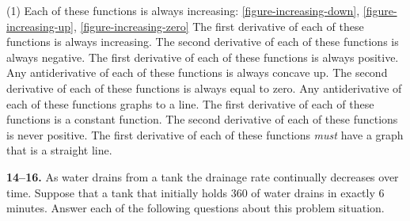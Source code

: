 \documentclass[10pt,oneside,]{book}
\theoremstyle{plain}
\theoremstyle{definition}
\numberwithin{equation}{section}
\begin{document}
\par
\begin{exercisegroup}(1)
\exercise[4.]\hypertarget{exercise-301}{\null}Each of these functions is always increasing: \hyperref[figure-increasing-down]{\ref{figure-increasing-down}}, \hyperref[figure-increasing-up]{\ref{figure-increasing-up}}, \hyperref[figure-increasing-zero]{\ref{figure-increasing-zero}}%
\exercise[5.]\hypertarget{exercise-302}{\null}The first derivative of each of these functions is always increasing.%
\exercise[6.]\hypertarget{exercise-303}{\null}The second derivative of each of these functions is always negative.%
\exercise[7.]\hypertarget{exercise-304}{\null}The first derivative of each of these functions is always positive.%
\exercise[8.]\hypertarget{exercise-305}{\null}Any antiderivative of each of these functions is always concave up.%
\exercise[9.]\hypertarget{exercise-306}{\null}The second derivative of each of these functions is always equal to zero.%
\exercise[10.]\hypertarget{exercise-307}{\null}Any antiderivative of each of these functions graphs to a line.%
\exercise[11.]\hypertarget{exercise-308}{\null}The first derivative of each of these functions is a constant function.%
\exercise[12.]\hypertarget{exercise-309}{\null}The second derivative of each of these functions is never positive.%
\exercise[13.]\hypertarget{exercise-310}{\null}The first derivative of each of these functions \emph{must} have a graph that is a straight line.%
\end{exercisegroup}
\par\smallskip\noindent
\textbf{14--16. }\hypertarget{exercisegroup-65}{\null}As water drains from a tank the drainage rate continually decreases over time.  Suppose that a tank 
that initially holds \SI{360}{\gallon} of water drains in exactly \(6\) minutes.  Answer each of the following questions about this problem situation.%
\par
\end{document}
